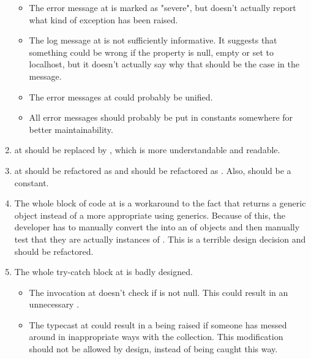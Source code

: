\begin{enumerate}
\begin{itemize}
			\item The error message at  is marked as "severe", but doesn't actually report what kind of exception has been raised. 
			\item The log message at  is not sufficiently informative. It suggests that something could be wrong if the  property is null, empty or set to localhost, but it doesn't actually say why that should be the case in the message. 
			\item The error messages at  could probably be unified. 
			\item All error messages should probably be put in constants somewhere for better maintainability. 
		\end{itemize}
	\item {}  at  should be replaced by , which is more understandable and readable.
	\item {}  at  should be refactored as  and  should be refactored as . Also,  should be a constant. 
	\item {} The whole block of code at  is a workaround to the fact that  returns a generic  object instead of a more appropriate  using generics. Because of this, the developer has to manually convert the  into an  of  objects and then manually test that they are actually instances of . This is a terrible design decision and should be refactored.  
	\item {} The whole try-catch block at  is badly designed. 
		\begin{itemize}
			\item The invocation  at  doesn't check if  is not null. This could result in an unnecessary . 
			\item The typecast at  could result in a  being raised if someone has messed around in inappropriate ways with the  collection. This modification should not be allowed by design, instead of being caught this way. 

\end{itemize}
\end{enumerate}
